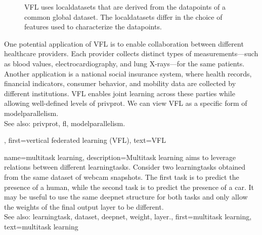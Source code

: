 {{\begin{figure}[H]
\begin{center}
			\end{center}
		\caption{VFL uses \glspl{localdataset} that are derived from the \glspl{datapoint} of a common global \gls{dataset}. 
			The \glspl{localdataset} differ in the choice of \glspl{feature} used to characterize 
			the \glspl{datapoint}.\label{fig_vertical_FL_dict}}
		\end{figure}
		One potential application of VFL is to enable collaboration between 
		different healthcare providers. Each provider collects distinct types of measurements—such as blood 
		values, electrocardiography, and lung X-rays—for the same patients. Another 
		application is a national social insurance system, where health records, financial 
		indicators, consumer behavior, and mobility \gls{data} are collected by different 
		institutions. VFL enables joint learning across these parties while allowing 
		well-defined levels of \gls{privprot}. We can view VFL as a specific form of
		\gls{modelparallelism}.
		\\
		See also: \gls{privprot}, \gls{fl}, \gls{modelparallelism}.},
	first={vertical federated learning (VFL)},
	text={VFL}
}

{name={multitask learning},
	description={Multitask learning aims to leverage relations between 
	 	different \glspl{learningtask}. Consider two \glspl{learningtask} obtained from the 
	 	same \gls{dataset} of webcam snapshots. The first task is to predict the presence 
	 	of a human, while the second task is to predict the presence of a car. It may be useful 
	 	to use the same \gls{deepnet} structure for both tasks and only allow the \glspl{weight} of 
	 	the final \gls{output} \gls{layer} to be different.
	 			\\ 
		See also: \gls{learningtask}, \gls{dataset}, \gls{deepnet}, \gls{weight}, \gls{layer}.},
	first={multitask learning},
	text={multitask learning}
}

